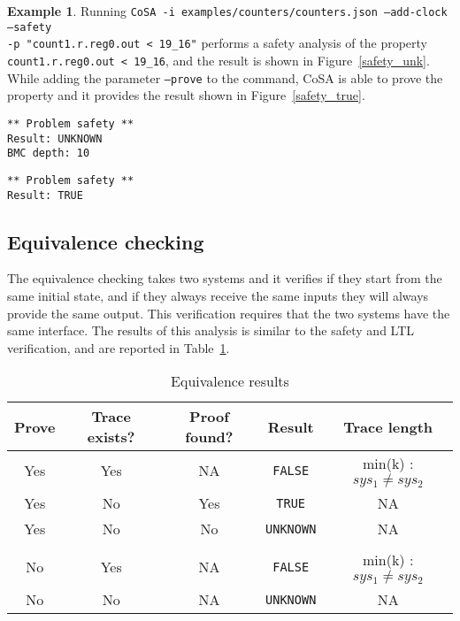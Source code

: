 \documentclass{article}
\theoremstyle{definition}
\newtheorem{example}{Example}[section]
\begin{document}
\begin{example}
  Running \texttt{CoSA -i examples/counters/counters.json --add-clock
    --safety\\ -p "count1.r.reg0.out < 19\_16"} performs a safety
  analysis of the property \texttt{count1.r.reg0.out < 19\_16}, and
  the result is shown in Figure~\ref{safety_unk}. While adding the
  parameter \texttt{--prove} to the command, CoSA is able to prove the
  property and it provides the result shown in Figure~\ref{safety_true}.

\begin{lstlisting}[frame=single,language=ets,caption=Safety example (UNKNOWN),label=safety_unk]
** Problem safety **
Result: UNKNOWN
BMC depth: 10
\end{lstlisting}

\begin{lstlisting}[frame=single,language=ets,caption=Safety example (TRUE),label=safety_true]
** Problem safety **
Result: TRUE
\end{lstlisting}

\end{example}


\subsection{Equivalence checking}

The equivalence checking takes two systems and it verifies if they
start from the same initial state, and if they always receive the same
inputs they will always provide the same output. This verification
requires that the two systems have the same interface. The results of
this analysis is similar to the safety and LTL verification, and are
reported in Table~\ref{tab:equivalence_results}.

\begin{table}[h]
  \centering
\begin{tabular}{ c c c | c c }
  Prove & Trace exists? & Proof found? & Result & Trace length \\ \hline
  Yes & Yes & NA & \texttt{FALSE} & min(k) : $sys_1 \neq sys_2$  \\
  Yes & No & Yes & \texttt{TRUE} & NA  \\
  Yes & No & No & \texttt{UNKNOWN} & NA  \\ \\
  No & Yes & NA & \texttt{FALSE} & min(k) : $sys_1 \neq sys_2$  \\
  No & No & NA & \texttt{UNKNOWN} & NA  \\
\end{tabular}
\label{tab:equivalence_results}
\caption{Equivalence results}
\end{table}
\end{document}
